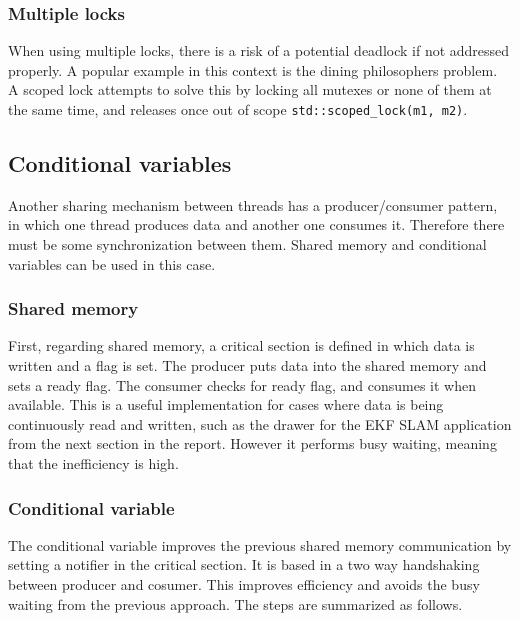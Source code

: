 \documentclass[conference]{IEEEtran}
\begin{document}
\subsubsection{Multiple locks}

When using multiple locks, there is a risk of a potential deadlock if not addressed properly. A popular example in this context is the dining philosophers problem. A scoped lock attempts to solve this by locking all mutexes or none of them at the same time, and releases once out of scope \verb|std::scoped_lock(m1, m2)|.

\subsection{Conditional variables}

Another sharing mechanism between threads has a producer/consumer pattern, in which one thread produces data and another one consumes it. Therefore there must be some synchronization between them. Shared memory and conditional variables can be used in this case.

\subsubsection{Shared memory}

First, regarding shared memory, a critical section is defined in which data is written and a flag is set. The producer puts data into the shared memory and sets a ready flag.  The consumer checks for ready flag, and consumes it when available. This is a useful implementation for cases where data is being continuously read and written, such as the drawer for the EKF SLAM application from the next section in the report. However it performs busy waiting, meaning that the inefficiency is high.

\subsubsection{Conditional variable}

The conditional variable improves the previous shared memory communication by setting a notifier in the critical section. It is based in a two way handshaking between producer and cosumer. This improves efficiency and avoids the busy waiting from the previous approach. The steps are summarized as follows.
\end{document}

